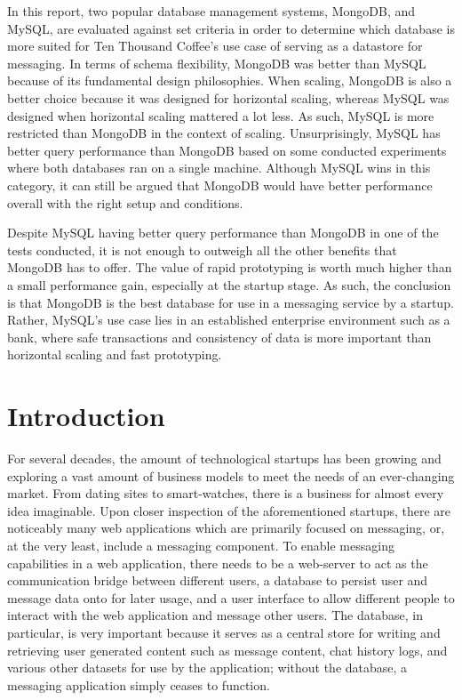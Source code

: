 \documentclass[12pt]{article}
\begin{document}
In this report, two popular database management systems, MongoDB, and MySQL, are evaluated against set criteria in order to determine which database is more suited for Ten Thousand Coffee's use case of serving as a datastore for messaging. In terms of schema flexibility, MongoDB was better than MySQL because of its fundamental design philosophies. When scaling, MongoDB is also a better choice because it was designed for horizontal scaling, whereas MySQL was designed when horizontal scaling mattered a lot less. As such, MySQL is more restricted than MongoDB in the context of scaling. Unsurprisingly, MySQL has better query performance than MongoDB based on some conducted experiments where both databases ran on a single machine. Although MySQL wins in this category, it can still be argued that MongoDB would have better performance overall with the right setup and conditions.

Despite MySQL having better query performance than MongoDB in one of the tests conducted, it is not enough to outweigh all the other benefits that MongoDB has to offer. The value of rapid prototyping is worth much higher than a small performance gain, especially at the startup stage. As such, the conclusion is that MongoDB is the best database for use in a messaging service by a startup. Rather, MySQL's use case lies in an established enterprise environment such as a bank, where safe transactions and consistency of data is more important than horizontal scaling and fast prototyping.

\newpage


\toc
\lof
\lot


\section{Introduction}
For several decades, the amount of technological startups has been growing and exploring a vast amount of business models to meet the needs of an ever-changing market. From dating sites to smart-watches, there is a business for almost every idea imaginable. Upon closer inspection of the aforementioned startups, there are noticeably many web applications which are primarily focused on messaging, or, at the very least, include a messaging component. To enable messaging capabilities in a web application, there needs to be a web-server to act as the communication bridge between different users, a database to persist user and message data onto for later usage, and a user interface to allow different people to interact with the web application and message other users. The database, in particular, is very important because it serves as a central store for writing and retrieving user generated content such as message content, chat history logs, and various other datasets for use by the application; without the database, a messaging application simply ceases to function.
\end{document}
